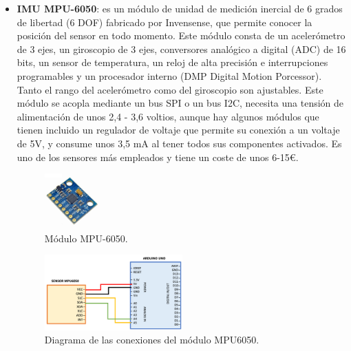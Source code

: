 \begin{itemize}
    \item \textbf{IMU MPU-6050}: es un módulo de unidad de medición inercial de 6 grados de libertad (6 DOF) fabricado por Invensense, que permite conocer la posición del sensor en todo momento. Este módulo consta de un acelerómetro de 3 ejes, un giroscopio de 3 ejes, conversores analógico a digital (ADC) de 16 bits, un sensor de temperatura, un reloj de alta precisión e interrupciones programables y un procesador interno (DMP Digital Motion Porcessor). Tanto el rango del acelerómetro como del giroscopio son ajustables. Este módulo se acopla mediante un bus SPI o un bus I2C, necesita una tensión de alimentación de unos 2,4 - 3,6 voltios, aunque hay algunos módulos que tienen incluido un regulador de voltaje que permite su conexión a un voltaje de 5V, y consume unos 3,5 mA al tener todos sus componentes activados. Es uno de los sensores más empleados y tiene un coste de unos 6-15€.
\begin{figure}[h!]
    \centering
    \includegraphics[width=0.2\textwidth]{img/imgMPU6050.jpg}
    \caption{Módulo MPU-6050\cite{imgMPU6050}.}
    \label{fig:imgMPU6050} %
\end{figure}
\begin{figure}[h!]
    \centering
    \includegraphics[width=0.5\textwidth]{img/MPU6050.png}
    \caption{Diagrama de las conexiones del módulo MPU6050.}
    \label{fig:MPU6050} %
\end{figure}


\end{itemize}
